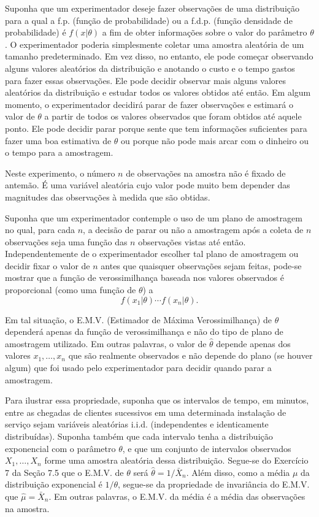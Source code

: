 Suponha que um experimentador deseje fazer observações de uma distribuição para a qual a f.p. (função de probabilidade) ou a f.d.p. (função densidade de probabilidade) é $f(x|\theta)$ a fim de obter informações sobre o valor do parâmetro $\theta$. O experimentador poderia simplesmente coletar uma amostra aleatória de um tamanho predeterminado. Em vez disso, no entanto, ele pode começar observando alguns valores aleatórios da distribuição e anotando o custo e o tempo gastos para fazer essas observações. Ele pode decidir observar mais alguns valores aleatórios da distribuição e estudar todos os valores obtidos até então. Em algum momento, o experimentador decidirá parar de fazer observações e estimará o valor de $\theta$ a partir de todos os valores observados que foram obtidos até aquele ponto. Ele pode decidir parar porque sente que tem informações suficientes para fazer uma boa estimativa de $\theta$ ou porque não pode mais arcar com o dinheiro ou o tempo para a amostragem.

Neste experimento, o número $n$ de observações na amostra não é fixado de antemão. É uma variável aleatória cujo valor pode muito bem depender das magnitudes das observações à medida que são obtidas.

Suponha que um experimentador contemple o uso de um plano de amostragem no qual, para cada $n$, a decisão de parar ou não a amostragem após a coleta de $n$ observações seja uma função das $n$ observações vistas até então. Independentemente de o experimentador escolher tal plano de amostragem ou decidir fixar o valor de $n$ antes que quaisquer observações sejam feitas, pode-se mostrar que a função de verossimilhança baseada nos valores observados é proporcional (como uma função de $\theta$) a
$$ f(x_1|\theta) \cdots f(x_n|\theta). $$

Em tal situação, o E.M.V. (Estimador de Máxima Verossimilhança) de $\theta$ dependerá apenas da função de verossimilhança e não do tipo de plano de amostragem utilizado. Em outras palavras, o valor de $\hat{\theta}$ depende apenas dos valores $x_1, \dots, x_n$ que são realmente observados e não depende do plano (se houver algum) que foi usado pelo experimentador para decidir quando parar a amostragem.

Para ilustrar essa propriedade, suponha que os intervalos de tempo, em minutos, entre as chegadas de clientes sucessivos em uma determinada instalação de serviço sejam variáveis aleatórias i.i.d. (independentes e identicamente distribuídas). Suponha também que cada intervalo tenha a distribuição exponencial com o parâmetro $\theta$, e que um conjunto de intervalos observados $X_1, \dots, X_n$ forme uma amostra aleatória dessa distribuição. Segue-se do Exercício 7 da Seção 7.5 que o E.M.V. de $\theta$ será $\hat{\theta} = 1/\bar{X}_n$. Além disso, como a média $\mu$ da distribuição exponencial é $1/\theta$, segue-se da propriedade de invariância do E.M.V. que $\hat{\mu} = \bar{X}_n$. Em outras palavras, o E.M.V. da média é a média das observações na amostra.

